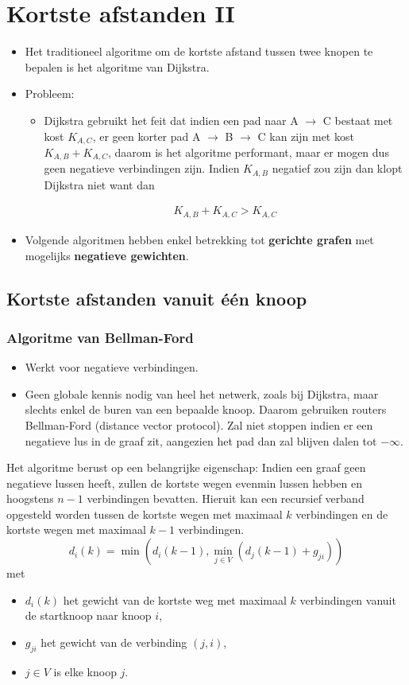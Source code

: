 \chapter{Kortste afstanden II}
\begin{itemize}
	\item Het traditioneel algoritme om de kortste afstand tussen twee knopen te bepalen is het algoritme van Dijkstra.
	\item Probleem:
	\begin{itemize}
		\item Dijkstra gebruikt het feit dat indien een pad naar A $\rightarrow$ C bestaat met kost $K_{A, C}$, er geen korter pad A $\rightarrow$ B $\rightarrow$ C kan zijn met kost $K_{A, B} + K_{A, C}$, daarom is het algoritme performant, maar er mogen dus geen negatieve verbindingen zijn. Indien $K_{A, B}$ negatief zou zijn dan klopt Dijkstra niet want dan 

		\begin{align*}
			K_{A, B} + K_{A, C} > K_{A, C}
		\end{align*}
	\end{itemize}
	\item Volgende algoritmen hebben enkel betrekking tot \textbf{gerichte grafen} met mogelijks \textbf{negatieve gewichten}.

\end{itemize}
\section{Kortste afstanden vanuit één knoop}
\subsection{Algoritme van Bellman-Ford}
\begin{itemize}
	\item  Werkt voor negatieve verbindingen.
	\item  Geen globale kennis nodig van heel het netwerk, zoals bij Dijkstra, maar slechts enkel de buren van een bepaalde knoop. Daarom gebruiken routers Bellman-Ford (distance vector protocol).
	\alert  Zal niet stoppen indien er een negatieve lus in de graaf zit, aangezien het pad dan zal blijven dalen tot $-\infty$. 
\end{itemize}

Het algoritme berust op een belangrijke eigenschap: Indien een graaf geen negatieve lussen heeft, zullen de kortste wegen evenmin lussen hebben en hoogstens $n - 1$ verbindingen bevatten. Hieruit kan een recursief verband opgesteld worden tussen de kortste wegen met maximaal $k$ verbindingen en de kortste wegen met maximaal $k - 1$ verbindingen.
$$d_i(k) = \min(d_i(k - 1), \min\limits_{j \in V} (d_j(k - 1) + g_{ji}))$$
met
\begin{itemize}
	\item $d_i(k)$ het gewicht van de kortste weg met maximaal $k$ verbindingen vanuit de startknoop naar knoop $i$,
	\item $g_{ji}$ het gewicht van de verbinding $(j, i)$,
	\item $j \in V$ is elke knoop $j$.
\end{itemize}




